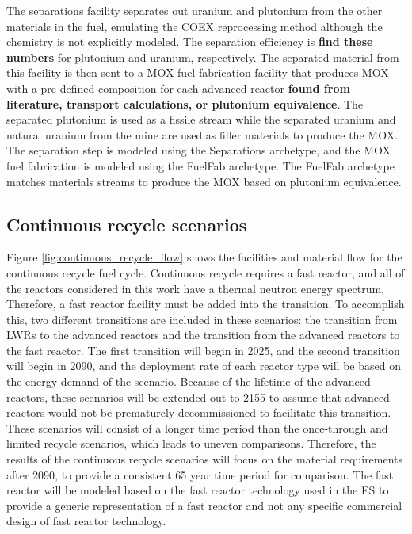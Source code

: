 The separations facility separates out uranium and plutonium from the other 
materials in the fuel, emulating the COEX reprocessing method although the 
chemistry is not explicitly modeled. The separation efficiency is \textbf{find 
these numbers} for plutonium and uranium, respectively. The separated 
material from this facility is then sent to a \gls{MOX} fuel fabrication 
facility that produces \gls{MOX} with a pre-defined composition for each 
advanced reactor \textbf{found from literature, transport calculations, 
or plutonium equivalence}. 
The separated plutonium is used as a fissile stream while the separated 
uranium and natural uranium from the mine are used as filler materials to 
produce the \gls{MOX}. The separation step is modeled using the \Cycamore 
Separations archetype, and the \gls{MOX} fuel fabrication is modeled 
using the \Cycamore FuelFab archetype. The \Cycamore FuelFab archetype 
matches materials streams to produce the \gls{MOX} based on plutonium 
equivalence. 

\subsection{Continuous recycle scenarios}
Figure \ref{fig:continuous_recycle_flow} shows the facilities and material 
flow for the continuous recycle fuel cycle. Continuous recycle 
requires a fast reactor, and all of the reactors considered in this 
work have a thermal neutron energy spectrum. Therefore, a fast reactor 
facility 
must be added into the transition. To accomplish this, two different 
transitions are included in these scenarios: the transition from 
\glspl{LWR} to the advanced reactors and the transition from the 
advanced reactors to the fast reactor. The first transition will begin 
in 2025, and the second transition will begin in 2090, and the deployment 
rate of each reactor type will be based on the energy demand of the 
scenario. Because of the lifetime of the advanced reactors, these scenarios 
will be extended out to 2155 to assume that advanced reactors would not 
be prematurely decommissioned to facilitate this transition. These 
scenarios will consist of a longer time period than the once-through 
and limited recycle scenarios, which leads to uneven comparisons. Therefore, 
the results of the continuous recycle scenarios will focus on the 
material requirements after 2090, to provide a consistent 65 year 
time period for comparison. 
The fast reactor will be modeled 
based on the fast reactor technology used in the \gls{ES} 
\cite{wigeland_nuclear_2014} to provide a generic representation of 
a fast reactor and not any specific commercial design of fast reactor 
technology. 

